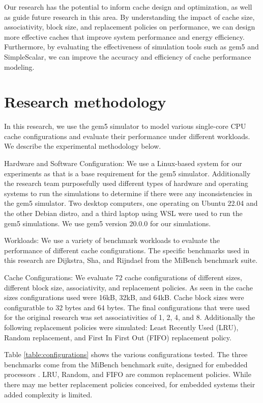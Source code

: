 \documentclass[conference]{IEEEtran}
\begin{document}
Our research has the potential to inform cache design and optimization, as well as guide future research in this area. By understanding the impact of cache size, associativity, block size, and replacement policies on performance, we can design more effective caches that improve system performance and energy efficiency. Furthermore, by evaluating the effectiveness of simulation tools such as gem5 and SimpleScalar, we can improve the accuracy and efficiency of cache performance modeling.

\section{Research methodology}
In this research, we use the gem5 simulator to model various single-core CPU cache configurations and evaluate their performance under different workloads. We describe the experimental methodology below.

Hardware and Software Configuration:
We use a Linux-based system for our experiments as that is a base requirement for the gem5 simulator. Additionally the research team purposefully used different types of hardware and operating systems to run the simulations to determine if there were any inconsistencies in the gem5 simulator. Two desktop computers, one operating on Ubuntu 22.04 and the other Debian distro, and a third laptop using WSL were used to run the gem5 simulations. We use gem5 version 20.0.0 for our simulations.

Workloads:
We use a variety of benchmark workloads to evaluate the performance of different cache configurations. The specific benchmarks used in this research are Dijkstra, Sha, and Rijndael from the MiBench benchmark suite.

Cache Configurations:
We evaluate 72 cache configurations of different sizes, different block size, associativity, and replacement policies. As seen in the cache sizes configurations used were 16kB, 32kB, and 64kB. Cache block sizes were configuratble to 32 bytes and 64 bytes. The final configurations that were used for the original research was set associativities of 1, 2, 4, and 8. Additionally the following replacement policies were simulated: Least Recently Used (LRU), Random replacement, and First In First Out (FIFO) replacement policy.

Table \ref{table:configurations} shows the various configurations tested. The three benchmarks come from the MiBench benchmark suite, designed for embedded processors \cite{990739}. LRU, Random, and FIFO are common replacement policies. While there may me better replacement policies conceived, for embedded systems their added complexity is limited.
\end{document}
